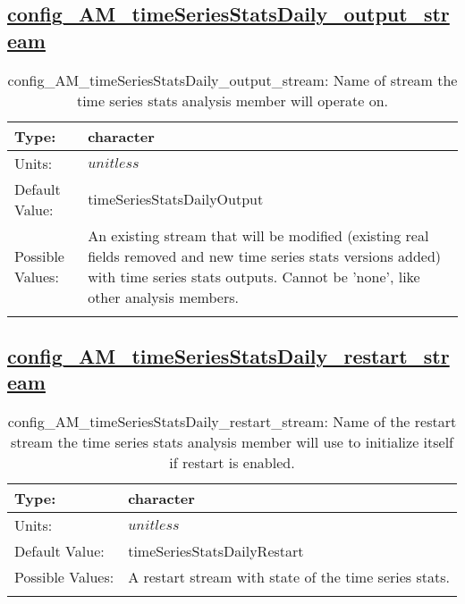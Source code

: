 \subsection[config\_AM\_timeSeriesStatsDaily\_output\_stream]{\hyperref[sec:nm_tab_AM_timeSeriesStatsDaily]{config\_AM\_timeSeriesStatsDaily\_output\_stream}}
\label{subsec:nm_sec_config_AM_timeSeriesStatsDaily_output_stream}
\begin{center}
\begin{longtable}{| p{2.0in} || p{4.0in} |}
    \hline
    Type: & character \\
    \hline
    Units: & $unitless$ \\
    \hline
    Default Value: & timeSeriesStatsDailyOutput \\
    \hline
    Possible Values: & An existing stream that will be modified (existing real fields removed and new time series stats versions added) with time series stats outputs. Cannot be 'none', like other analysis members. \\
    \hline
    \caption{config\_AM\_timeSeriesStatsDaily\_output\_stream: Name of stream the time series stats analysis member will operate on.}
\end{longtable}
\end{center}
\subsection[config\_AM\_timeSeriesStatsDaily\_restart\_stream]{\hyperref[sec:nm_tab_AM_timeSeriesStatsDaily]{config\_AM\_timeSeriesStatsDaily\_restart\_stream}}
\label{subsec:nm_sec_config_AM_timeSeriesStatsDaily_restart_stream}
\begin{center}
\begin{longtable}{| p{2.0in} || p{4.0in} |}
    \hline
    Type: & character \\
    \hline
    Units: & $unitless$ \\
    \hline
    Default Value: & timeSeriesStatsDailyRestart \\
    \hline
    Possible Values: & A restart stream with state of the time series stats. \\
    \hline
    \caption{config\_AM\_timeSeriesStatsDaily\_restart\_stream: Name of the restart stream the time series stats analysis member will use to initialize itself if restart is enabled.}
\end{longtable}
\end{center}
